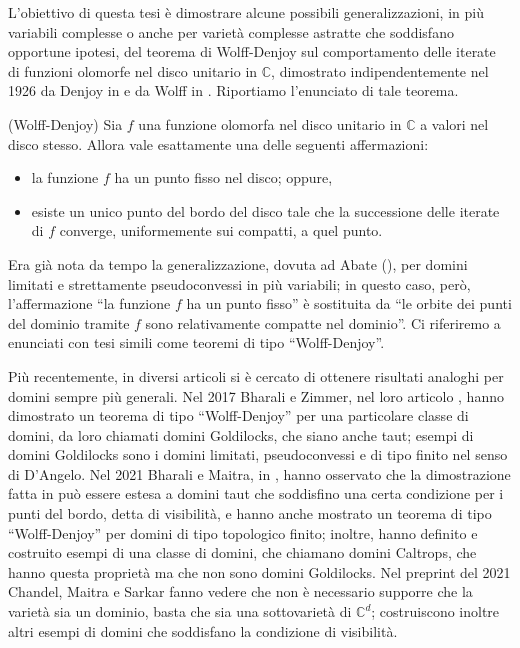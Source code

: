 L'obiettivo di questa tesi è dimostrare alcune possibili generalizzazioni, in più variabili complesse o anche per varietà complesse astratte che soddisfano opportune ipotesi, del teorema di Wolff-Denjoy sul comportamento delle iterate di funzioni olomorfe nel disco unitario in $\mathbb{C}$, dimostrato indipendentemente nel 1926 da Denjoy in \cite{D} e da Wolff in \cite{Wo}. Riportiamo l'enunciato di tale teorema.

\begin{thm}
    (Wolff-Denjoy) Sia $f$ una funzione olomorfa nel disco unitario in $\mathbb{C}$ a valori nel disco stesso. Allora vale esattamente una delle seguenti affermazioni:
    \begin{itemize}
        \item la funzione $f$ ha un punto fisso nel disco; oppure,
        \item esiste un unico punto del bordo del disco tale che la successione delle iterate di $f$ converge, uniformemente sui compatti, a quel punto.
    \end{itemize}
\end{thm}

Era già nota da tempo la generalizzazione, dovuta ad Abate (\cite[Theorem 0.5]{A2}), per domini limitati e strettamente pseudoconvessi in più variabili; in questo caso, però, l'affermazione ``la funzione $f$ ha un punto fisso'' è sostituita da ``le orbite dei punti del dominio tramite $f$ sono relativamente compatte nel dominio''. Ci riferiremo a enunciati con tesi simili come teoremi di tipo ``Wolff-Denjoy''.

Più recentemente, in diversi articoli si è cercato di ottenere risultati analoghi per domini sempre più generali. Nel 2017 Bharali e Zimmer, nel loro articolo \cite{BZ1}, hanno dimostrato un teorema di tipo ``Wolff-Denjoy'' per una particolare classe di domini, da loro chiamati domini Goldilocks, che siano anche taut; esempi di domini Goldilocks sono i domini limitati, pseudoconvessi e di tipo finito nel senso di D'Angelo. Nel 2021 Bharali e Maitra, in \cite{BM}, hanno osservato che la dimostrazione fatta in \cite{BZ1} può essere estesa a domini taut che soddisfino una certa condizione per i punti del bordo, detta di visibilità, e hanno anche mostrato un teorema di tipo ``Wolff-Denjoy'' per domini di tipo topologico finito; inoltre, hanno definito e costruito esempi di una classe di domini, che chiamano domini Caltrops, che hanno questa proprietà ma che non sono domini Goldilocks. Nel preprint \cite{CMS} del 2021 Chandel, Maitra e Sarkar fanno vedere che non è necessario supporre che la varietà sia un dominio, basta che sia una sottovarietà di $\mathbb{C}^d$; costruiscono inoltre altri esempi di domini che soddisfano la condizione di visibilità.

